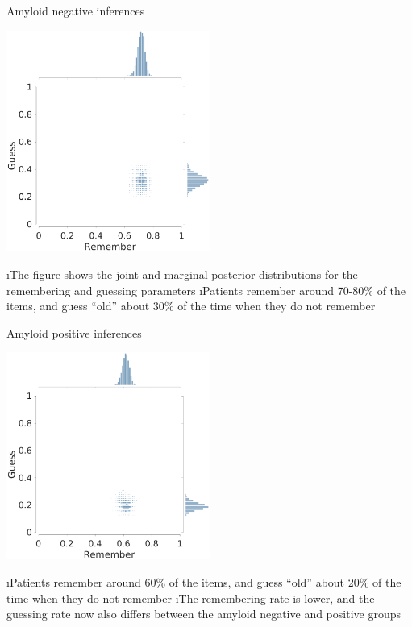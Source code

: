 \documentclass[10pt]{beamer}
\begin{document}
\begin{frame}[fragile]{Amyloid negative inferences}
\begin{center}
{\includegraphics[width = 0.5\textwidth, trim = {0cm 0 0cm 0.cm}, clip]{twoHighThreshold_1_betaAmyloidNegative.eps}}
\end{center}
\bi
\i The figure shows the joint and marginal posterior distributions for the remembering and guessing parameters
\i Patients remember around 70-80\% of the items, and guess ``old'' about 30\% of the time when they do not remember
\ei
\end{frame}

\begin{frame}[fragile]{Amyloid positive inferences}
\begin{center}
\includegraphics[width = 0.5\textwidth, trim = {0cm 0 0cm 1cm}, clip]{twoHighThreshold_1_betaAmyloidPositive.eps}
\end{center}
\bi
\i Patients remember around 60\% of the items, and guess ``old'' about 20\% of the time when they do not remember
\i The remembering rate is lower, and the guessing rate now also differs between the amyloid negative and positive groups
\ei
\end{frame}
\end{document}
